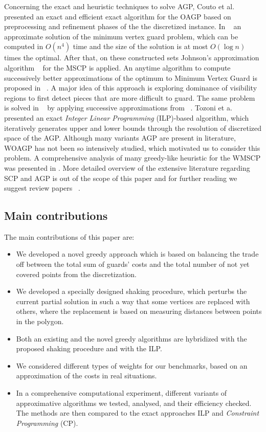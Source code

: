 \documentclass[runningheads,a4paper]{elsarticle}
\begin{document}
	Concerning the exact and heuristic techniques to solve AGP, Couto et al.~\cite{couto2007exact} presented an exact and efficient exact algorithm for the OAGP based on preprocessing and refinement phases of the the discretized instance. In ~\cite{ghosh2010approximation} an approximate solution of the minimum vertex guard problem, which can be computed in $O(n^4)$ time and the size of the solution is at most $O(\log n)$ times the optimal. After that, on these constructed sets Johnson’s approximation algorithm ~\cite{johnson1974approximation} for the MSCP is applied. An anytime algorithm to compute successively better approximations of the optimum to Minimum Vertex Guard is proposed in ~\cite{tomas2003approximation}.  A major idea of this approach is exploring dominance of visibility regions to first detect pieces that are
	more difficult to guard. The same problem is solved   in ~\cite{tomas2006visibility} by applying successive approximations from  ~\cite{tomas2003approximation}.
	Tozoni et a. ~\cite{tozoni2013practical,tozoni2016algorithm}  presented an exact \emph{Integer Linear Programming}  (ILP)-based  algorithm, which iteratively generates upper and lower bounds through the resolution of discretized space of the AGP. Although many variants AGP are present in literature, WOAGP has not been so intensively studied, which motivated us to consider this problem.
	A comprehensive analysis of many greedy-like heuristic for the WMSCP was presented in \cite{vasko2016best}.
	More detailed overview of the extensive literature regarding SCP and AGP is out of the scope of this paper and for further reading we suggest review papers ~\cite{caprara2000algorithms,ren2010new,ghosh2010approximation2}. 
	
	\subsection{Main contributions}
	The main contributions of this paper are:
	\begin{itemize}
		\item We developed a novel greedy approach which is based on balancing the trade off between the total sum of guards' costs and the total number of not yet covered points from the discretization.
		\item We developed a specially designed shaking procedure, which perturbs the current partial solution in such a way that some vertices are replaced with others, where the replacement is based on measuring  distances between points in the polygon.
		\item Both an existing and the novel greedy algorithms are hybridized with the proposed shaking procedure and with the ILP.
		\item We considered different types of weights for our benchmarks, based on an approximation of the costs in real situations.
		\item In a comprehensive computational experiment,  different variants of approximative algorithms we tested, analysed, and their efficiency checked. The methods are then compared to the exact approaches ILP and \emph{Constraint Programming} (CP).
	\end{itemize}
\end{document}
